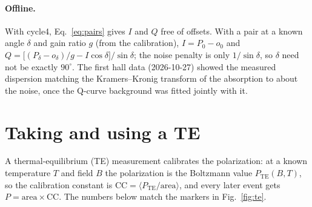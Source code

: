\documentclass[11pt]{article}
\begin{document}
\paragraph{Offline.} With cycle4, Eq.~\eqref{eq:pairs} gives $I$ and $Q$ free of offsets. With a pair at a known
angle $\delta$ and gain ratio $g$ (from the calibration),
$I=P_0-o_0$ and $Q=\big[(P_\delta-o_\delta)/g-I\cos\delta\big]/\sin\delta$; the noise penalty is only
$1/\sin\delta$, so $\delta$ need not be exactly $90^\circ$. The first hall data (2026-10-27) showed the measured
dispersion matching the Kramers--Kronig transform of the absorption to about the noise, once the Q-curve
background was fitted jointly with it.

\section{Taking and using a TE}
\label{sec:te}
A thermal-equilibrium (TE) measurement calibrates the polarization: at a known temperature $T$ and field $B$ the
polarization is the Boltzmann value $P_\mathrm{TE}(B,T)$, so the calibration constant is
$\mathrm{CC}=\langle P_\mathrm{TE}/\mathrm{area}\rangle$, and every later event gets $P=\mathrm{area}\times\mathrm{CC}$.
The numbers below match the markers in Fig.~\ref{fig:te}.
\end{document}
